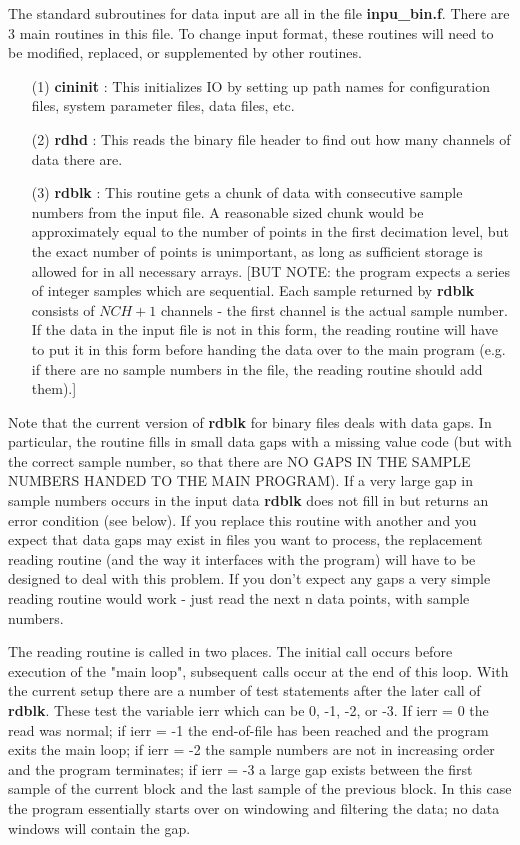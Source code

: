 The standard subroutines for data input are all 
in the file {\bf inpu\_bin.f}.
There are 3 main routines in this file.
To change input format, these routines will need to
be modified, replaced, or supplemented by other routines.
\begin{itemize}
\item[(1)]
{\bf cininit}  :  This initializes IO by
setting up path names for configuration files, system parameter files,
data files, etc.
\item[(2)]
{\bf rdhd}  :  This reads the binary file header to find out
how many channels of data there are.
\item[(3)]
{\bf rdblk}  : This routine gets a chunk of data with 
consecutive sample numbers from the input file.
A reasonable sized chunk would be
approximately equal to the number of points
in the first decimation level, but the exact number of points
is unimportant, as long as sufficient storage is allowed
for in all necessary arrays.
[BUT NOTE: the program expects a series of integer samples which are
sequential.
Each sample returned by {\bf rdblk}
consists of $NCH+1$ channels -
the first channel is the actual sample number.
If the data in the input file is not in this form,
the reading routine will have to put it in this
form before handing the data over to the main program
(e.g. if there are no sample numbers in the file,
the reading routine should add them).]
\end{itemize}

Note that the current version of
{\bf rdblk} for binary files deals with data gaps.
In particular, the routine fills in small data gaps
with a missing value code
(but with the correct sample number, so that there
are NO GAPS IN THE SAMPLE NUMBERS HANDED TO
THE MAIN PROGRAM).
If a very large gap in sample numbers occurs
in the input data {\bf rdblk} does not fill in but returns
an error condition (see below).
If you replace this routine
with another and you expect that data gaps may exist in files
you want to process, the replacement reading routine
(and the way it interfaces with the program)
will have to be designed to deal with this problem.
If you don't expect any gaps
a very simple reading routine would work -
just read the next n data points, with sample numbers.

The reading routine is called in two places.
The initial call occurs before execution of
the "main loop", subsequent calls occur at the end
of this loop.
With the current setup there are a number of test statements
after the later call of {\bf rdblk}.
These test the variable ierr which can be 0, -1, -2, or -3.
If ierr = 0 the read was normal; if ierr = -1 the end-of-file
has been reached and the program exits the main loop; if ierr = -2
the sample numbers are not in increasing order and the program terminates;
if ierr = -3 a large gap exists between the first sample
of the current block and the last sample
of the previous block.
In this case the program essentially starts over on windowing
and filtering the data; no data windows will contain the
gap.

